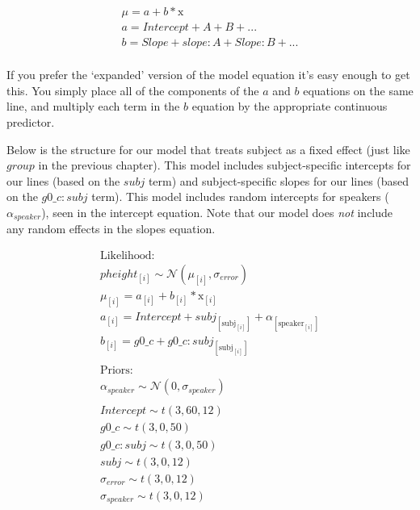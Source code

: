 \documentclass[
]{book}
\begin{document}
\begin{equation}
\begin{split}
\mu = a + b * \mathrm{x} \\
a = Intercept + A + B + ... \\
b = Slope + slope \colon A + Slope \colon B + ... \\
\end{split}
\label{eq:64}
\end{equation}

If you prefer the `expanded' version of the model equation it's easy enough to get this. You simply place all of the components of the \(a\) and \(b\) equations on the same line, and multiply each term in the \(b\) equation by the appropriate continuous predictor.

Below is the structure for our model that treats subject as a fixed effect (just like \(group\) in the previous chapter). This model includes subject-specific intercepts for our lines (based on the \(subj\) term) and subject-specific slopes for our lines (based on the \(g0\_c \colon subj\) term). This model includes random intercepts for speakers (\(\alpha_{speaker}\)), seen in the intercept equation. Note that our model does \emph{not} include any random effects in the slopes equation.

\begin{equation}
\begin{split}
\textrm{Likelihood:} \\
pheight_{[i]} \sim \mathcal{N}(\mu_{[i]},\sigma_{error}) \\
\mu_{[i]} = a_{[i]} + b_{[i]} * \mathrm{x}_{[i]}  \\ 
a_{[i]} = Intercept + subj_{[\mathrm{subj}_{[i]}]} + \alpha_{[\mathrm{speaker}_{[i]}]}  \\
b_{[i]} =  g0\_c + g0\_c \colon subj_{[\mathrm{subj}_{[i]}]} \\ \\
\textrm{Priors:} \\
\alpha_{speaker} \sim \mathcal{N}(0,\sigma_{speaker}) \\ \\ 
Intercept \sim t(3, 60, 12) \\
g0\_c \sim t(3, 0, 50) \\ 
g0\_c \colon subj \sim t(3, 0, 50) \\ 
subj \sim t(3, 0, 12) \\ 
\sigma_{error} \sim t(3, 0, 12) \\
\sigma_{speaker} \sim t(3, 0, 12) \\ 
\end{split}
\label{eq:65}
\end{equation}
\end{document}

